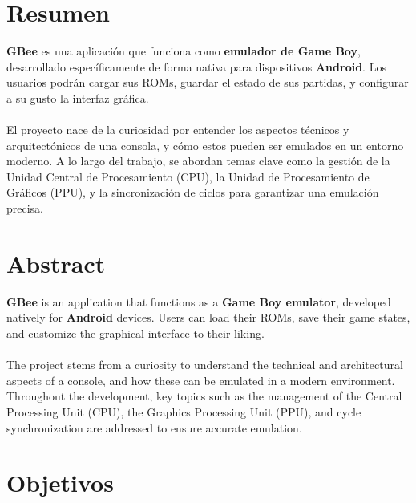 
\chapter{Resumen}
\label{resumen}
\textbf{GBee} es una aplicación que funciona como \textbf{emulador de Game Boy}, desarrollado específicamente de forma nativa para dispositivos \textbf{Android}. Los usuarios podrán cargar sus ROMs, guardar el estado de sus partidas, y configurar a su gusto la interfaz gráfica.
\\\\
El proyecto nace de la curiosidad por entender los aspectos técnicos y arquitectónicos de una consola, y cómo estos pueden ser emulados en un entorno moderno. A lo largo del trabajo, se abordan temas clave como la gestión de la Unidad Central de Procesamiento (CPU), la Unidad de Procesamiento de Gráficos (PPU), y la sincronización de ciclos para garantizar una emulación precisa.
{\let\clearpage\relax\chapter*{Abstract}}

\textbf{GBee} is an application that functions as a \textbf{Game Boy emulator}, developed natively for \textbf{Android} devices. Users can load their ROMs, save their game states, and customize the graphical interface to their liking.
\\\\
The project stems from a curiosity to understand the technical and architectural aspects of a console, and how these can be emulated in a modern environment. Throughout the development, key topics such as the management of the Central Processing Unit (CPU), the Graphics Processing Unit (PPU), and cycle synchronization are addressed to ensure accurate emulation.
\cleardoublepage

\chapter{Objetivos}
\label{objetivos}

